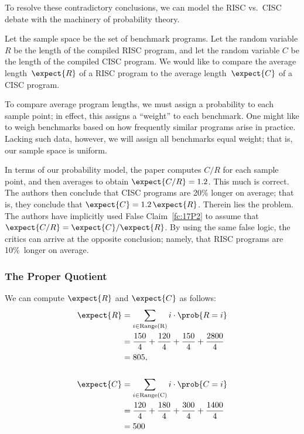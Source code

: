 \begin{editingnotes}
To resolve these contradictory conclusions, we can model the RISC
vs.\ CISC debate with the machinery of probability theory.

Let the sample space be the set of benchmark programs.  Let the random
variable $R$ be the length of the compiled RISC program, and let the
random variable $C$ be the length of the compiled CISC program.  We would
like to compare the average length~$\expect{R}$ of a RISC program to the
average length~$\expect{C}$ of a CISC program.

To compare average program lengths, we must assign a probability to
each sample point; in effect, this assigns a ``weight'' to each
benchmark.  One might like to weigh benchmarks based on how frequently
similar programs arise in practice.  Lacking such data, however, we
will assign all benchmarks equal weight; that is, our sample space is
uniform.

In terms of our probability model, the paper computes $C / R$ for each
sample point, and then averages to obtain $\expect{C / R} = 1.2$.
This much is correct.  The authors then conclude that CISC programs
are 20\% longer on average; that is, they conclude that $\expect{C} =
1.2\, \expect{R}$.  Therein lies the problem.  The authors have
implicitly used False Claim~\ref{fc:17P2} to assume that $\expect{C/R}
= \expect{C}/\expect{R}$.  By using the same false logic, the critics
can arrive at the opposite conclusion; namely, that RISC programs are
10\%~longer on average.


\subsubsection{The Proper Quotient}

We can compute $\expect{R}$ and $\expect{C}$ as follows:
\begin{align*}
\expect{R}  
    & = \sum_{i \in \text{Range(R)}} i \cdot \prob{R = i} \\
    & = \frac{150}{4}+\frac{120}{4}+\frac{150}{4}+\frac{2800}{4} \\
    & = 805, \\
\\
\expect{C}
    & = \sum_{i \in \text{Range(C)}} i \cdot \prob{C = i} \\
    & = \frac{120}{4}+\frac{180}{4}+\frac{300}{4}+\frac{1400}{4} \\
    & = 500
\end{align*}


\end{editingnotes}
